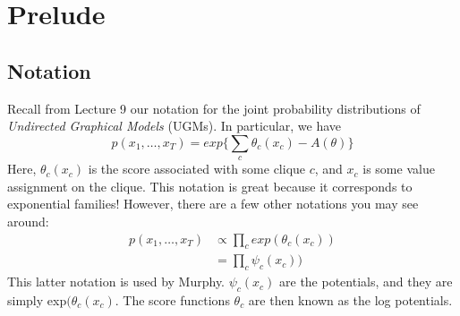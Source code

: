 \documentclass{article}
\begin{document}

\section{Prelude}
\subsection{Notation}
Recall from Lecture 9 our notation for the joint probability distributions of \textit{Undirected Graphical Models} (UGMs). In particular, we have
\[
p(x_1,\ldots,x_T)=exp\{\sum\limits_c \theta_c(x_c) - A(\theta)\}
\]
Here, $\theta_c(x_c)$ is the score associated with some clique $c$, and $x_c$ is some value assignment on the clique. This notation is great because it corresponds to exponential families! However, there are a few other notations you may see around:
\begin{align*}
p(x_1,\ldots,x_T) &\propto \prod\limits_c exp(\theta_c(x_c))\\
&= \prod\limits_c \psi_c(x_c))
\end{align*}
This latter notation is used by Murphy. $\psi_c(x_c)$ are the potentials, and they are simply exp$(\theta_c(x_c)$. The score functions $\theta_c$ are then known as the log potentials.
\end{document}
